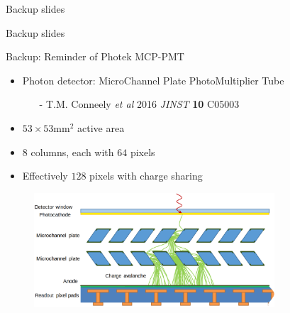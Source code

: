 \documentclass[xcolor={dvipsnames}]{beamer}
\begin{document}
\begin{frame}{Backup slides}
  \begin{center}
    {\huge Backup slides}
  \end{center}
\end{frame}

\begin{frame}{Backup: Reminder of Photek MCP-PMT}
  \begin{itemize}
    \setlength\itemsep{0.7em}
    \item{Photon detector: MicroChannel Plate PhotoMultiplier Tube}
    \begin{itemize}
      \item[-]{T.M. Conneely \textit{et al} 2016 \textit{JINST} \textbf{10} C05003}
    \end{itemize}
    \item{$53\times 53\si{\milli\meter\squared}$ active area}
    \item{$8$ columns, each with $64$ pixels}
    \item{Effectively $128$ pixels with charge sharing}
  \end{itemize}
  \vspace{-0.35cm}
  \begin{figure}
    \centering
    \includegraphics[width = 0.8\textwidth]{Figs/MCP_PMT_illustration.png}
  \end{figure}
\end{frame}
\end{document}
